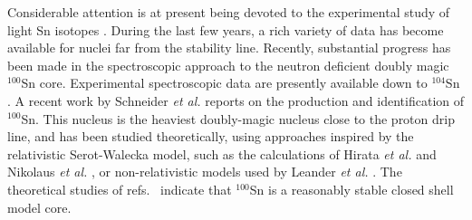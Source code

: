 Considerable attention is at present being devoted to the
experimental
study of light Sn isotopes \cite{schu92,schu91,grawe92,ryk92,joh93}.
During
the last few years,
a rich
variety of data has 
become available for nuclei far from the stability line.
Recently, substantial progress has been made in the spectroscopic approach
to the neutron deficient doubly magic $^{100}$Sn core. Experimental
spectroscopic data are presently available down to $^{104}$Sn
\cite{schu92,schu91,grawe92,ryk92}. A recent work by Schneider
{\em et al.} \cite{sn100} reports on the production and
identification of $^{100}$Sn. This nucleus is the heaviest
doubly-magic nucleus close to the proton drip line, and has
been studied theoretically, using
approaches inspired by the relativistic Serot-Walecka \cite{sw86}
model, such as the calculations of Hirata {\em et al.} \cite{hir91}
and Nikolaus {\em et al.} \cite{hnm92}, or non-relativistic
models used by Leander {\em et al.} \cite{lean84}.  The theoretical
studies of refs.\ \cite{hir91,hnm92} indicate 
that $^{100}$Sn is a reasonably stable closed shell model
core. 

